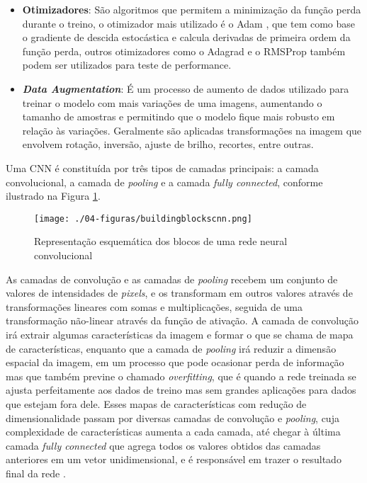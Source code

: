\begin{itemize}
    \item \textbf{Otimizadores}: São algoritmos que permitem a minimização da função perda durante o treino, o otimizador mais utilizado é o Adam \cite{Kingma:2014}, que tem como base o gradiente de descida estocástica e calcula derivadas de primeira ordem da função perda, outros otimizadores como o Adagrad e o RMSProp também podem ser utilizados para teste de performance.
    \item  \textbf{\textit{Data Augmentation}}: É um processo de aumento de dados utilizado para treinar o modelo com mais variações de uma imagens, aumentando o tamanho de amostras e permitindo que o modelo fique mais robusto em relação às variações. Geralmente são aplicadas transformações na imagem que envolvem rotação, inversão, ajuste de brilho, recortes, entre outras.
\end{itemize}

Uma CNN é constituída por três tipos de camadas principais: a camada convolucional, a camada de \textit{pooling} e a camada \textit{fully connected}, conforme ilustrado na Figura \ref{fig:bbcnn}.

\begin{figure}[!htb]
\centering
    \texttt{[image: ./04-figuras/buildingblockscnn.png]}
	\caption{Representação esquemática dos blocos de uma rede neural convolucional}\vspace{-0.2cm}
    \label{fig:bbcnn}
\end{figure}

As camadas de convolução e as camadas de \textit{pooling} recebem um conjunto de valores de intensidades de \textit{pixels}, e os transformam em outros valores através de transformações lineares com somas e multiplicações, seguida de uma transformação não-linear através da função de ativação. A camada de convolução irá extrair algumas características da imagem e formar o que se chama de mapa de características, enquanto que a camada de \textit{pooling} irá reduzir a dimensão espacial da imagem, em um processo que pode ocasionar perda de informação mas que também previne o chamado \textit{overfitting}, que é quando a rede treinada se ajusta perfeitamente aos dados de treino mas sem grandes aplicações para dados que estejam fora dele. Esses mapas de características com redução de dimensionalidade passam por diversas camadas de convolução e \textit{pooling}, cuja complexidade de características aumenta a cada camada, até chegar à última camada \textit{fully connected} que agrega todos os valores obtidos das camadas anteriores em um vetor unidimensional, e é responsável em trazer o resultado final da rede \cite{Voulodimos:2018,Yamashita:2018}.


